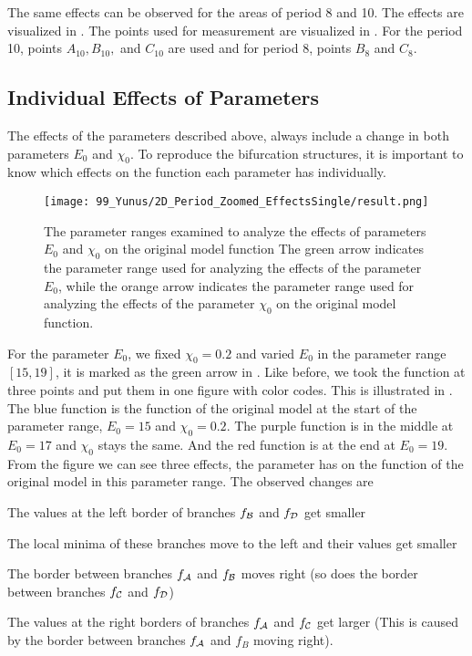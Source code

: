 The same effects can be observed for the areas of period 8 and 10.
The effects are visualized in .
The points used for measurement are visualized in .
For the period 10, points $A_{10}, B_{10},$ and $C_{10}$ are used and for period 8, points $B_8$ and $C_8$.

\subsection{Individual Effects of Parameters}
\label{sec:yunus.param.effects.individual}

The effects of the parameters described above, always include a change in both parameters $E_0$ and $\chi_0$.
To reproduce the bifurcation structures, it is important to know which effects on the function each parameter has individually.

\begin{figure}
	\centering
	\texttt{[image: 99\_Yunus/2D\_Period\_Zoomed\_EffectsSingle/result.png]}
	\caption[The parameter ranges examined to analyze the effects of parameters on the original model function]{
		The parameter ranges examined to analyze the effects of parameters $E_0$ and $\chi_0$ on the original model function
		The green arrow indicates the parameter range used for analyzing the effects of the parameter $E_0$, while the orange arrow indicates the parameter range used for analyzing the effects of the parameter $\chi_0$ on the original model function.
	}
	\label{fig:setup.char.evolution.single.map}
\end{figure}

For the parameter $E_0$, we fixed $\chi_0 = 0.2$ and varied $E_0$ in the parameter range $[15, 19]$, it is marked as the green arrow in .
Like before, we took the function at three points and put them in one figure with color codes.
This is illustrated in .
The blue function is the function of the original model at the start of the parameter range, $E_0 = 15$ and $\chi_0 = 0.2$.
The purple function is in the middle at $E_0 = 17$ and $\chi_0$ stays the same.
And the red function is at the end at $E_0 = 19$.
From the figure we can see three effects, the parameter has on the function of the original model in this parameter range.
The observed changes are
\begin{enumerate*}
	\item The values at the left border of branches $f_{\mathcal{B}}$ and $f_{\mathcal{D}}$ get smaller
	\item The local minima of these branches move to the left and their values get smaller
	\item The border between branches $f_{\mathcal{A}}$ and $f_{\mathcal{B}}$ moves right (so does the border between branches $f_{\mathcal{C}}$ and $f_{\mathcal{D}}$)
	\item The values at the right borders of branches $f_{\mathcal{A}}$ and $f_{\mathcal{C}}$ get larger (This is caused by the border between branches $f_{\mathcal{A}}$ and $f_B$ moving right).
\end{enumerate*}

